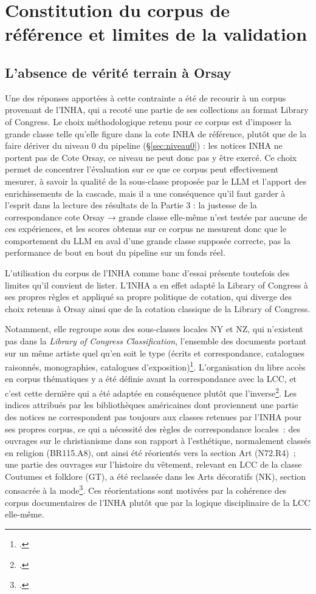 \section{Constitution du corpus de référence et limites de la validation}

\subsection{L'absence de vérité terrain à Orsay}
\label{sec:absence-verite-terrain}

Une des réponses apportées à cette contrainte a été de recourir à un corpus provenant de l’INHA, qui a recoté une partie de ses collections au format Library of Congress. Le choix méthodologique retenu pour ce corpus est d’imposer la grande classe telle qu’elle figure dans la cote INHA de référence, plutôt que de la faire dériver du niveau 0 du pipeline (\S\ref{sec:niveau0}) : les notices INHA ne portent pas de Cote Orsay, ce niveau ne peut donc pas y être exercé. Ce choix permet de concentrer l’évaluation sur ce que ce corpus peut effectivement mesurer, à savoir la qualité de la sous-classe proposée par le LLM et l’apport des enrichissements de la cascade, mais il a une conséquence qu’il faut garder à l’esprit dans la lecture des résultats de la Partie 3 : la justesse de la correspondance cote Orsay → grande classe elle-même n’est testée par aucune de ces expériences, et les scores obtenus sur ce corpus ne mesurent donc que le comportement du LLM en aval d’une grande classe supposée correcte, pas la performance de bout en bout du pipeline sur un fonds réel.

L’utilisation du corpus de l’INHA comme banc d’essai présente toutefois des limites qu’il convient de lister. L’INHA a en effet adapté la Library of Congress à ses propres règles et appliqué sa propre politique de cotation, qui diverge des choix retenus à Orsay ainsi que de la cotation classique de la Library of Congress. 

Notamment, elle regroupe sous des sous-classes locales NY et NZ, qui n'existent pas dans la \textit{Library of Congress Classification}, l'ensemble des documents portant sur un même artiste quel qu'en soit le type (écrits et correspondance, catalogues raisonnés, monographies, catalogues d'exposition)\footcite{inhalcc}. 
L'organisation du libre accès en corpus thématiques y a été définie avant la correspondance avec la LCC, et c'est cette dernière qui a été adaptée en conséquence plutôt que l'inverse\footcite{inhalcc}. Les indices attribués par les bibliothèques américaines dont proviennent une partie des notices ne correspondent pas toujours aux classes retenues par l'INHA pour ses propres corpus, ce qui a nécessité des règles de correspondance locales~: des ouvrages sur le christianisme dans son rapport à l'esthétique, normalement classés en religion (BR115.A8), ont ainsi été réorientés vers la section Art (N72.R4)~; une partie des ouvrages sur l'histoire du vêtement, relevant en LCC de la classe Coutumes et folklore (GT), a été reclassée dans les Arts décoratifs (NK), section consacrée à la mode\footcite{inhalcc}. Ces réorientations sont motivées par la cohérence des corpus documentaires de l'INHA plutôt que par la logique disciplinaire de la LCC elle-même. 

